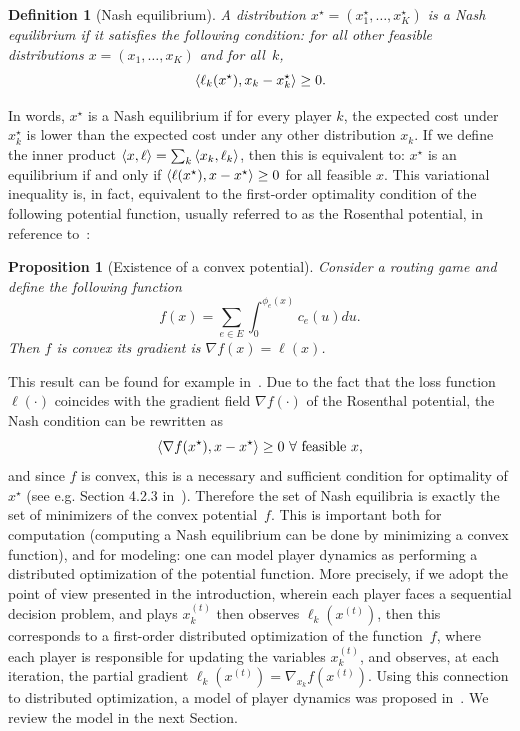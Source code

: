 \documentclass{sig-alternate-ipsn13}
\newtheorem{definition}{Definition}
\newtheorem{proposition}{Proposition}
\begin{document}
\begin{definition}[Nash equilibrium]
A distribution $x^\star = (x_1^\star, \dots, x_K^\star)$ is a Nash equilibrium if it satisfies the following condition: for all other feasible  distributions $x = (x_1, \dots, x_K)$ and for all~$k$,
\[
\left\langle \ell_k(x^\star), x_k - x_k^\star \right\rangle \geq 0.
\]
\end{definition}
In words, $x^\star$ is a Nash equilibrium if for every player $k$, the expected cost under $x_k^\star$ is lower than the expected cost under any other distribution $x_k$. If we define the inner product $\left\langle x, \ell \right\rangle = \sum_{k} \left\langle x_k, \ell_k \right\rangle$, then this is equivalent to: $x^\star$ is an equilibrium if and only if $\left\langle \ell(x^\star), x - x^\star \right\rangle \geq 0$ for all feasible $x$. This variational inequality is, in fact, equivalent to the first-order optimality condition of the following potential function, usually referred to as the Rosenthal potential, in reference to~\cite{rosenthal1973class}:
\begin{proposition}[Existence of a convex potential]
Consider a routing game and define the following function
\[
f(x) = \sum_{e \in E} \int_0^{\phi_e(x)} c_e(u)du.
\]
Then $f$ is convex its gradient is $\nabla f(x) = \ell(x)$.
\end{proposition}
This result can be found for example in~\cite{roughgarden2002bad}. Due to the fact that the loss function $\ell(\cdot)$ coincides with the gradient field $\nabla f(\cdot)$ of the Rosenthal potential, the Nash condition can be rewritten as
\[
\braket{\nabla f(x^\star)}{x - x^\star} \geq 0 \ \forall \text{ feasible }x,
\]
and since $f$ is convex, this is a necessary and sufficient condition for optimality of $x^\star$ (see e.g. Section 4.2.3 in~\cite{boyd2010convex}). Therefore the set of Nash equilibria is exactly the set of minimizers of the convex potential~$f$. This is important both for computation (computing a Nash equilibrium can be done by minimizing a convex function), and for modeling: one can model player dynamics as performing a distributed optimization of the potential function. More precisely, if we adopt the point of view presented in the introduction, wherein each player faces a sequential decision problem, and plays $x^{(t)}_k$ then observes $\ell_k(x^{(t)})$, then this corresponds to a first-order distributed optimization of the function~$f$, where each player is responsible for updating the variables $x_k^{(t)}$, and observes, at each iteration, the partial gradient $\ell_k(x^{(t)}) = \nabla_{x_k} f(x^{(t)})$. Using this connection to distributed optimization, a model of player dynamics was proposed in~\cite{krichene2015MD}. We review the model in the next Section.
\end{document}
